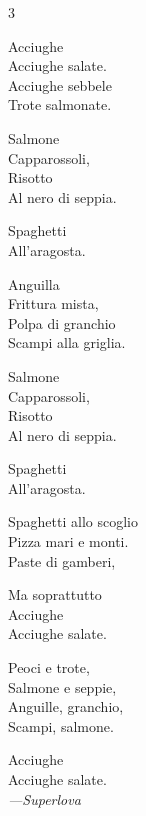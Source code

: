 \begin{center}
	\begin{minipage}{\textwidth} %
		\begin{recipeblock}
			\begin{multicols}{3}
				\footnotesize
				\centering %
				\setlength{\parskip}{1em} %
				
				Acciughe \\
				Acciughe salate. \\
				Acciughe sebbele \\
				Trote salmonate. 
				
				Salmone \\
				Capparossoli,\\
				Risotto \\
				Al nero di seppia. 
				
				Spaghetti \\
				All'aragosta. 
				
				Anguilla \\
				Frittura mista, \\
				Polpa di granchio \\
				Scampi alla griglia. 
				
				Salmone \\
				Capparossoli, \\
				Risotto \\
				Al nero di seppia. 
				
				Spaghetti \\
				All'aragosta. 
				
				Spaghetti allo scoglio \\
				Pizza mari e monti. \\
				Paste di gamberi, 
				
				Ma soprattutto \\
				Acciughe \\
				Acciughe salate. 
				
				Peoci e trote, \\
				Salmone e seppie, \\
				Anguille, granchio, \\
				Scampi, salmone. 
				
				Acciughe \\
				Acciughe salate. \\
				\vspace{\baselineskip}
				\normalsize \textit{---Superlova}
			\end{multicols}
		\end{recipeblock}
	\end{minipage}
\end{center}